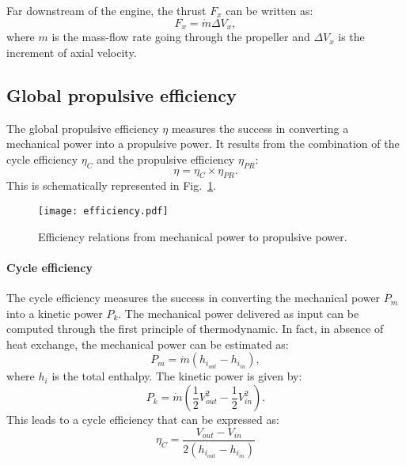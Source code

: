 Far downstream of the engine, 
the thrust $F_x$ can be written as:
\begin{equation}
	F_x = \dot{m} \Delta V_x,
	\label{eq:cror_thrust}
\end{equation}
where $m$ is the mass-flow rate going through the
propeller and $\Delta V_x$ is
the increment of axial velocity.

\subsection{Global propulsive efficiency}
\label{sub:cror_efficiency}

The global propulsive efficiency $\eta$ measures the 
success in converting a mechanical power into a
propulsive power. It results from the combination
of the cycle efficiency $\eta_{C}$ and the propulsive efficiency
$\eta_{PR}$:
\begin{equation}
	\eta = \eta_{C} \times \eta_{PR}.
\end{equation}
This is schematically represented in Fig.~\ref{fig:cror_efficiency}.
\begin{figure}[htb]
  \centering
  \texttt{[image: efficiency.pdf]}
  \caption{Efficiency relations from mechanical power to propulsive power.}
  \label{fig:cror_efficiency}
\end{figure}


\paragraph{Cycle efficiency}
The cycle efficiency measures the success in converting the mechanical
power $P_m$ into a kinetic power $P_k$. The mechanical power delivered as input
can be computed through the first principle of thermodynamic. In fact, in absence
of heat exchange, the mechanical power can be estimated as:
\begin{equation}
	P_m = \dot{m} (h_{i_{out}} - h_{i_{in}}),
\end{equation}
where $h_i$ is the total enthalpy.
The kinetic power is given by:
\begin{equation}
	P_k = \dot{m} \left(\frac{1}{2} V^2_{out} -
	\frac{1}{2} V^2_{in} \right).
\end{equation}
This leads to a cycle efficiency that can be expressed as:
\begin{equation}
	\eta_{C} = \frac{V_{out} - V_{in}}{2 (h_{i_{out}} - h_{i_{in}})}
\end{equation}

